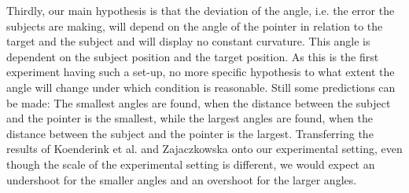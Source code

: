 Thirdly, our main hypothesis is that the deviation of the angle, i.e. the error the subjects are making, will depend on the angle of the pointer in relation to the target and the subject and will display no constant curvature. This angle is dependent on the subject position and the target position. As this is the first experiment having such a set-up, no more specific hypothesis to what extent the angle will change under which condition is reasonable. Still some predictions can be made: The smallest angles are found, when the distance between the subject and the pointer is the smallest, while the largest angles are found, when the distance between the subject and the pointer is the largest. Transferring the results of Koenderink et al. \citeyear{Koenderink.2000} and Zajaczkowska \citeyear{Zajackowska1956.} onto our experimental setting, even though the scale of the experimental setting is different, we would expect an undershoot for the smaller angles and an overshoot for the larger angles. %








